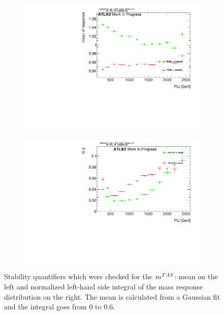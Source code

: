 \begin{figure}
    \centering
    \begin{subfigure}[b]{0.45\textwidth}
	\centering
        \includegraphics[width=\textwidth]{appendixB/mTAS_W_calibmCal_20:07:01-03-11-2016/71graph_h_JetRatio_mJ12CALO_meanResponseMvsTA.pdf}
    \end{subfigure}
    \begin{subfigure}[b]{0.45\textwidth}
	\centering
        \includegraphics[width=\textwidth]{appendixB/mTAS_W_calibmCal_20:07:01-03-11-2016/74graph_h_JetRatio_mJ12CALO_I50ResponseMvsTAnorm.pdf}
 
    \end{subfigure}
    \caption[Mean and left-hand side integral for boosted $W/Z$]{Stability quantifiers which were checked for the $m^{TAS}$: mean on the left and normalized left-hand side integral of the mass response distribution on the right. The mean is calculated from a Gaussian fit and the integral goes from 0 to 0.6.} 
    \label{fig:meanandtail}
\end{figure}

